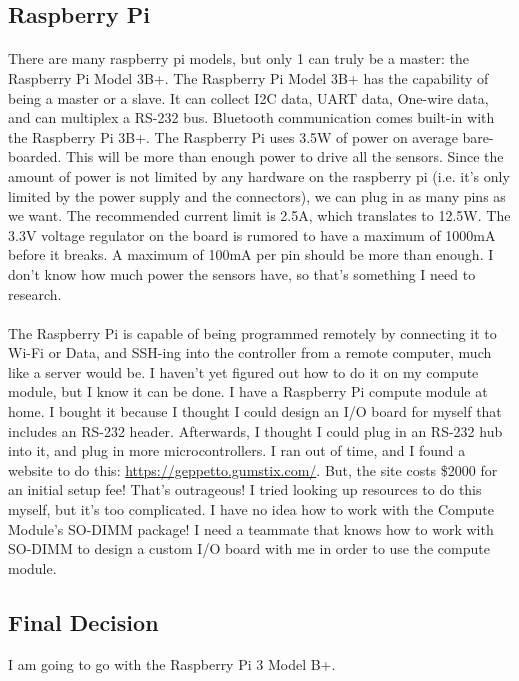 \subsection{Raspberry Pi}
\paragraph{}
There are many raspberry pi models, but only 1 can truly be a master: the Raspberry Pi Model 3B+. The Raspberry Pi Model 3B+ has the capability of being a master or a slave. It can collect I2C data, UART data, One-wire data, and can multiplex a RS-232 bus. Bluetooth communication comes built-in with the Raspberry Pi 3B+. The Raspberry Pi uses 3.5W of power on average bare-boarded. This will be more than enough power to drive all the sensors. Since the amount of power is not limited by any hardware on the raspberry pi (i.e. it’s only limited by the power supply and the connectors), we can plug in as many pins as we want. The recommended current limit is 2.5A, which translates to 12.5W. The 3.3V voltage regulator on the board is rumored to have a maximum of 1000mA before it breaks. A maximum of 100mA per pin should be more than enough. I don’t know how much power the sensors have, so that’s something I need to research.
\paragraph{}
The Raspberry Pi is capable of being programmed remotely by connecting it to Wi-Fi or Data, and SSH-ing into the controller from a remote computer, much like a server would be. I haven’t yet figured out how to do it on my compute module, but I know it can be done. I have a Raspberry Pi compute module at home. I bought it because I thought I could design an I/O board for myself that includes an RS-232 header. Afterwards, I thought I could plug in an RS-232 hub into it, and plug in more microcontrollers. I ran out of time, and I found a website to do this:
\href{https://geppetto.gumstix.com/}{https://geppetto.gumstix.com/}. But, the site costs \$2000 for an initial setup fee! That’s outrageous! I tried looking up resources to do this myself, but it’s too complicated. I have no idea how to work with the Compute Module’s SO-DIMM package! I need a teammate that knows how to work with SO-DIMM to design a custom I/O board with me in order to use the compute module.
 
\subsection{Final Decision}
I am going to go with the Raspberry Pi 3 Model B+.
 
